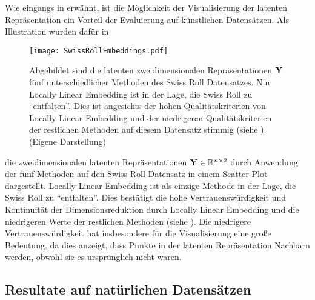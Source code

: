 Wie eingangs in  erwähnt, ist die
Möglichkeit der Visualisierung der latenten Repräsentation ein Vorteil der Evaluierung auf
künstlichen Datensätzen. Als Illustration wurden dafür in 
\begin{figure}[ht]
	\centering
	\texttt{[image: SwissRollEmbeddings.pdf]}
	\caption[Latente zweidimensionale Repräsentation $\mat{Y}$ fünf unterschiedlicher Methodes des Swiss Roll Datensatzes.]{Abgebildet sind die latenten zweidimensionalen Repräsentationen $\mat{Y}$ fünf unterschiedlicher Methoden des Swiss Roll Datensatzes. Nur Locally Linear Embedding ist in der Lage, die Swiss Roll zu \enquote{entfalten}. Dies ist angesichts der hohen Qualitätskriterien von Locally Linear Embedding und der niedrigeren Qualitätskriterien der restlichen Methoden auf diesem Datensatz stimmig (siehe ). (Eigene Darstellung)}
	\label{fig:SwissRollEmbeddings}
\end{figure}
die zweidimensionalen latenten Repräsentationen $\mathbf{Y} \in \mathbb{R}^{n \times 2}$ durch Anwendung der fünf Methoden auf den Swiss Roll Datensatz in einem Scatter-Plot dargestellt. Locally Linear Embedding ist als einzige Methode in der Lage, die Swiss Roll zu \enquote{entfalten}. Dies bestätigt die hohe Vertrauenswürdigkeit und Kontinuität der Dimensionsreduktion durch Locally Linear Embedding und die niedrigeren Werte der restlichen Methoden (siehe ). Die niedrigere Vertrauenswürdigkeit hat insbesondere für die Visualisierung eine große Bedeutung, da dies anzeigt, dass Punkte in der latenten Repräsentation Nachbarn werden, obwohl sie es ursprünglich nicht waren.

\subsection{Resultate auf natürlichen Datensätzen}
\label{ch:Vergleich:sec:Resultate:natuerlich}

